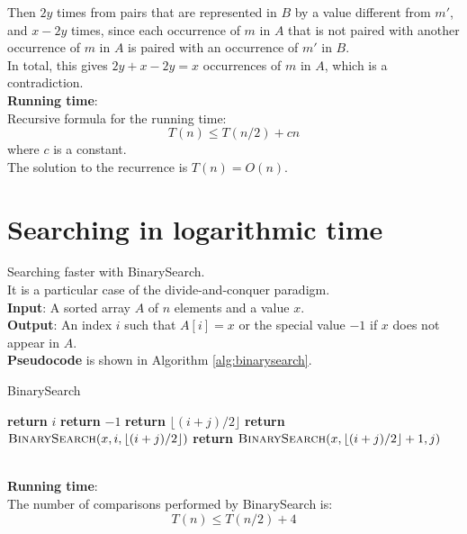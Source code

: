 \documentclass[onecolumn]{report}
\begin{document}
Then $2y$ times from pairs that are represented in $B$ by a value different from $m'$, and $x-2y$ times, since each occurrence of $m$ in $A$ that is not paired with another occurrence of $m$ in $A$ is paired with an occurrence of $m'$ in $B$.\\
In total, this gives $2y+x-2y=x$ occurrences of $m$ in $A$, which is a contradiction.\\
\textbf{Running time}:\\
Recursive formula for the running time:
\begin{equation*}
    T(n) \leq T(n/2) + cn
\end{equation*}
where $c$ is a constant.\\
The solution to the recurrence is $T(n) = O(n)$.\\

\section{Searching in logarithmic time}
Searching faster with BinarySearch.\\
It is a particular case of the divide-and-conquer paradigm.\\
\textbf{Input}: A sorted array $A$ of $n$ elements and a value $x$.\\
\textbf{Output}: An index $i$ such that $A[i] = x$ or the special value $-1$ if $x$ does not appear in $A$.\\
\textbf{Pseudocode} is shown in Algorithm \ref{alg:binarysearch}.
\begin{algorithm}
\label{alg:binarysearch}
\caption{BinarySearch}
\begin{algorithmic}[1]
\State \textbf{return} $i$
\Else
\State \textbf{return} $-1$
\EndIf
\Else
{}
\State \textbf{return} $\lfloor (i+j)/2 \rfloor$
\State \textbf{return} $\textsc{BinarySearch}(x,i,\lfloor (i+j)/2 \rfloor)$
\Else
\State \textbf{return} $\textsc{BinarySearch}(x,\lfloor (i+j)/2 \rfloor+1,j)$
\EndIf
\EndIf
\EndProcedure
\end{algorithmic}
\end{algorithm}\\
\textbf{Running time}:\\
The number of comparisons performed by BinarySearch is:\\
\begin{equation*}
    T(n) \leq  T(n/2) + 4  
\end{equation*}
\end{document}
